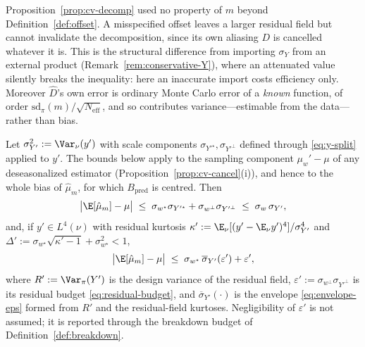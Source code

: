 \begin{remark}
\label{rem:cv-robust}
Proposition~\ref{prop:cv-decomp} used no property of $m$ beyond
Definition~\ref{def:offset}. A misspecified offset leaves a larger
residual field but cannot invalidate the decomposition, since its own
aliasing $D$ is cancelled whatever it is. This is the structural
difference from importing $\sigma_Y$ from an external product
(Remark~\ref{rem:conservative-Y}), where an attenuated value silently
breaks the inequality: here an inaccurate import costs efficiency only.
Moreover $\hat D$'s own error is ordinary Monte Carlo error of a
\emph{known} function, of order
$\mathrm{sd}_\pi(m)/\sqrt{N_{\mathrm{eff}}}$, and so contributes
variance---estimable from the data---rather than bias.
\end{remark}

\begin{corollary}
\label{cor:deseason-bound}
Let $\sigma_{Y'}^2:=\Var_\nu(y')$ with scale components
$\sigma_{Y'^{\star}},\sigma_{Y'^{\perp}}$ defined through
\eqref{eq:y-split} applied to $y'$. The bounds below apply to the
sampling component $\mu_w'-\mu$ of any deseasonalized estimator
(Proposition~\ref{prop:cv-cancel}(i)), and hence to the whole bias of
$\hat\mu_m$, for which $B_{\mathrm{pred}}$ is centred. Then
\[
  \big|\E[\hat\mu_m]-\mu\big|
  \;\le\;\sigma_{w^{\star}}\sigma_{Y'^{\star}}
        +\sigma_{w^{\perp}}\sigma_{Y'^{\perp}}
  \;\le\;\sigma_w\,\sigma_{Y'} ,
\]
and, if $y'\in L^4(\nu)$ with residual kurtosis
$\kappa':=\E_\nu[(y'-\E_\nu y')^4]/\sigma_{Y'}^4$ and
$\Delta':=\sigma_{w^{\star}}\sqrt{\kappa'-1}+\sigma_{w^{\star}}^2<1$,
\[
  \big|\E[\hat\mu_m]-\mu\big|
  \;\le\;\sigma_{w^{\star}}\,\overline{\sigma}_{Y'}(\varepsilon')
        +\varepsilon' ,
\]
where $R':=\Var_\pi(Y')$ is the design variance of the residual field,
$\varepsilon':=\sigma_{w^{\perp}}\sigma_{Y'^{\perp}}$ is its residual
budget \eqref{eq:residual-budget}, and
$\overline{\sigma}_{Y'}(\cdot)$ is the envelope
\eqref{eq:envelope-eps} formed from $R'$ and the residual-field
kurtoses. Negligibility of $\varepsilon'$ is not assumed; it is reported
through the breakdown budget of Definition~\ref{def:breakdown}.
\end{corollary}

